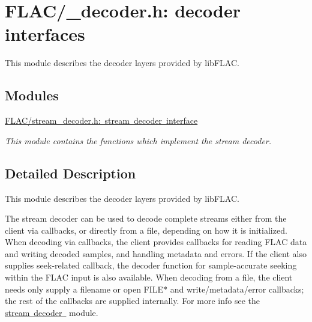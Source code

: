\hypertarget{group__flac__decoder}{}\section{F\+L\+A\+C/\+\_\+decoder.h\+: decoder interfaces}
\label{group__flac__decoder}


This module describes the decoder layers provided by lib\+F\+L\+AC.  


\subsection*{Modules}
\begin{DoxyCompactItemize}
\item 
\mbox{\hyperlink{group__flac__stream__decoder}{F\+L\+A\+C/stream\+\_\+decoder.\+h\+: stream decoder interface}}
\begin{DoxyCompactList}\small\item\em This module contains the functions which implement the stream decoder. \end{DoxyCompactList}\end{DoxyCompactItemize}


\subsection{Detailed Description}
This module describes the decoder layers provided by lib\+F\+L\+AC. 

The stream decoder can be used to decode complete streams either from the client via callbacks, or directly from a file, depending on how it is initialized. When decoding via callbacks, the client provides callbacks for reading F\+L\+AC data and writing decoded samples, and handling metadata and errors. If the client also supplies seek-\/related callback, the decoder function for sample-\/accurate seeking within the F\+L\+AC input is also available. When decoding from a file, the client needs only supply a filename or open {\ttfamily F\+I\+L\+E$\ast$} and write/metadata/error callbacks; the rest of the callbacks are supplied internally. For more info see the \mbox{\hyperlink{group__flac__stream__decoder}{stream decoder }} module. 
